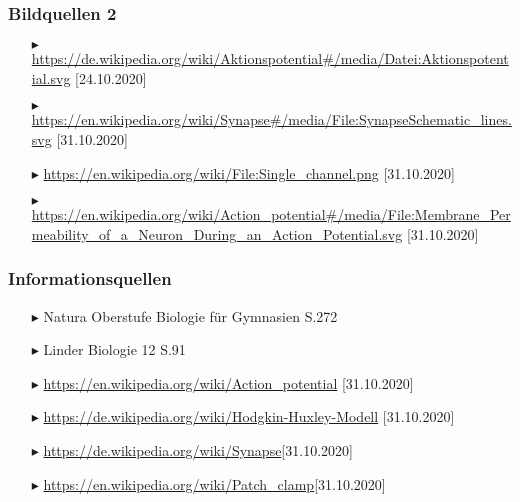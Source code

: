 \documentclass[ngerman]{beamer}
\begin{document}

\begin{frame}\frametitle{ Bildquellen 2 }

\begin{itemize}
	\item[$\blacktriangleright$] \url{https://de.wikipedia.org/wiki/Aktionspotential#/media/Datei:Aktionspotential.svg} [24.10.2020]
	\item[$\blacktriangleright$] \url{https://en.wikipedia.org/wiki/Synapse#/media/File:SynapseSchematic_lines.svg} [31.10.2020]
	\item[$\blacktriangleright$] \url{https://en.wikipedia.org/wiki/File:Single_channel.png} [31.10.2020]
	\item[$\blacktriangleright$] \url{https://en.wikipedia.org/wiki/Action_potential#/media/File:Membrane_Permeability_of_a_Neuron_During_an_Action_Potential.svg} [31.10.2020]
\end{itemize}


\end{frame}


\begin{frame}\frametitle{ Informationsquellen }

\begin{itemize}
	\item[$\blacktriangleright$] Natura Oberstufe Biologie für Gymnasien S.272
	\item[$\blacktriangleright$] Linder Biologie 12 S.91
	\item[$\blacktriangleright$] \url{https://en.wikipedia.org/wiki/Action_potential} [31.10.2020]
	\item[$\blacktriangleright$] \url{https://de.wikipedia.org/wiki/Hodgkin-Huxley-Modell} [31.10.2020]
	\item[$\blacktriangleright$] \url{https://de.wikipedia.org/wiki/Synapse}[31.10.2020]
	\item[$\blacktriangleright$] \url{https://en.wikipedia.org/wiki/Patch_clamp}[31.10.2020]
\end{itemize}

\end{frame}

\end{document}
